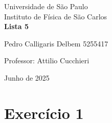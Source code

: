 \documentclass[12pt, a4paper]{article} %
\begin{document}
	
	\begin{titlepage}
		\begin{center}
\Huge{Universidade de S\~ao Paulo}\\
\large{Instituto de Física de S\~ao Carlos}\\
\vspace{20pt}
\vspace{200pt}
\textbf{Lista 5}\\
\vspace{8cm}
		\end{center}

\begin{flushleft}
\begin{tabbing}
Pedro Calligaris Delbem 5255417\\
\end{tabbing}
\vspace{0.5cm}
Professor: Attilio Cucchieri\\		
		\end{flushleft}
	
		\begin{center}
			\vspace{\fill}
	Junho de 2025	
		\end{center}
	\end{titlepage}

	\tableofcontents 
	\thispagestyle{empty}
	\newpage

    \section{Exerc\'icio 1}
\end{document}
